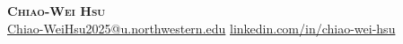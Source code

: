 
\begin{center}
  \textbf{\Huge \scshape Chiao-Wei Hsu} \\ \vspace{5pt plus 2pt minus 2pt}
  \small \faPhone\hspace{1pt}  \hspace{10pt} \faEnvelope\hspace{2pt}\href{mailto:Chiao-WeiHsu2025@u.northwestern.edu} {Chiao-WeiHsu2025@u.northwestern.edu}
  \hspace{10pt} \faLinkedin\hspace{2pt}\href{https://linkedin.com/in/chiao-wei-hsu}{linkedin.com/in/chiao-wei-hsu}
\end{center}